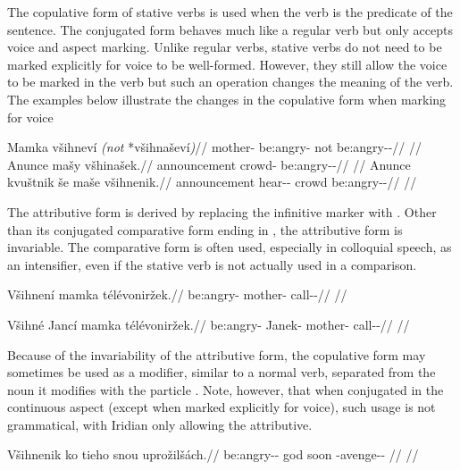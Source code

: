 The copulative form of stative verbs is used when the verb is the predicate of
the sentence. The conjugated form behaves much like a regular verb but only
accepts voice and aspect marking. Unlike regular verbs, stative verbs do not
need to be marked explicitly for voice to be well-formed. However, they still
allow the voice to be marked in the verb but such an operation changes the
meaning of the verb. The examples below illustrate the changes in the copulative form when marking for voice

\pex
\a\begingl
\gla Mamka všihneví \emph{(not} *všihnaševí\emph{)}//
\glb mother-\Dim{} be:angry-\Cont{} not be:angry-\Av{}-\Cont{}//
\glft {}//
\endgl
\a \begingl
\gla Anunce mašy všhinašek.//
\glb announcement crowd-\Acc{} be:angry-\Av{}-\Pf{}//
\glft {}//
\endgl
\a \begingl
\gla Anunce kvuštnik še maše všihnenik.//
\glb announcement hear-\Pv{}-\Pf{} \Com{} crowd be:angry-\Pv{}-\Pf{}//
\glft {}//
\endgl
\xe

The attributive form is derived by replacing the infinitive marker  with
. Other than its conjugated comparative form ending in , the
attributive form is invariable. The comparative form is often used, especially in colloquial speech,
as an intensifier, even if the stative verb is not actually used in a
comparison.

\ex
\begingl
\gla Všihnení mamka télévoniržek.//
\glb be:angry- mother- call-\Av{}-\Pf{}//
\glft {}//
\endgl
\xe

\ex
\begingl
\gla Všihné Jancí mamka télévoniržek.//
\glb be:angry-\Att{} Janek-\Gen{} mother-\Dim{} call-\Av{}-\Pf{}//
\glft {}//
\endgl
\xe

Because of the invariability of the attributive form, the copulative form may
sometimes be used as a modifier, similar to a normal verb, separated from the
noun it modifies with the particle . Note, however, that when conjugated
in the continuous aspect (except when marked explicitly for voice), such usage
is not grammatical, with Iridian only allowing the attributive.

\ex
\begingl
\gla Všihnenik ko tieho snou uprožilšách.//
\glb be:angry-\Pv{}-\Pf{} \Att{} god soon \Refl{}-avenge-\Av{}-\Ctp{} //
\glft {}//
\endgl
\xe

